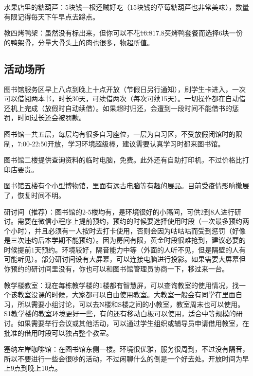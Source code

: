 
水果店里的糖葫芦：5块钱一根还贼好吃（15块钱的草莓糖葫芦也非常美味），数量有限记得每天下午早点去蹲点。

教四烤鸭架：虽然没有标出来，但你可以不花\sout{16.8}17.8买烤鸭套餐而选择6块一份的鸭架骨，分量大骨头上的肉也很多，物超所值。

\subsection{活动场所}


图书馆服务区早上八点到晚上十点开放（节假日另行通知），刷学生卡进入，一次可以借阅两本书，时长30天，可续借两次（每次可续15天）。一切操作都在自动借还机上完成（放假时自动续借）。如果超时归还，会遭到一段时间不能借书的惩罚，时间过长还会被罚款。

图书馆一共五层，每层均有很多自习座位，一层为自习区，不受放假闭馆时的限制，7:00-22:50开放，学习环境超级棒，建议需要认真学习时都来图书馆。

图书馆二楼提供查询资料的临时电脑，免费。此外还有自助打印机，不过价格比打印店要贵。

图书馆五楼有个小型博物馆，里面有远古电脑等有趣的展品。目前受疫情影响撤展了，恢复时间不明。


研讨间（推荐）：图书馆的2-5楼均有，是环境很好的小隔间，可供2到8人进行研讨。需要在微信小程序上提前预约，预约的时候要选择使用时段（一次最多预约两个小时），并且必须有一人按时去打卡使用，否则会因为咕咕咕而受到惩罚（好像是三次违约后本学期不能预约）。因为房间有限，黄金时段很难抢到，建议必要的时候提前1天预约。环境较好，隔音能力中等（外面的人听不见，但是隔壁的人有可能听见）。部分研讨间设有大屏幕，可以连接电脑进行投影。如果需要大屏幕但你预约的研讨间里没有，你也可以和图书馆管理员协商一下，移过来一台。

教学楼教室：现在每栋教学楼的1楼都有智慧屏，可以查询教室的使用情况，找一个该教室没课的时候，大家都可以自由使用教室。大教室一般会有同学在里面自习，所以需要小组讨论，可以去N楼和S楼之间的小教室，教室周末也可以使用。S1教学楼的教室环境更好一些，有的还有移动白板可以使用，适合中等规模的研讨。如果需要举行会议或其他活动，可以通过学生组织或辅导员申请借用教室，在批准的借用时段可以独占整个教室。

塞纳左岸咖啡馆：在图书馆东侧一楼。环境很优雅，服务很周到，不过没有隔音，所以不要进行一些会很吵的活动，不过闲聊什么的倒是一个好去处。开放时间为早上9点到晚上10点。

